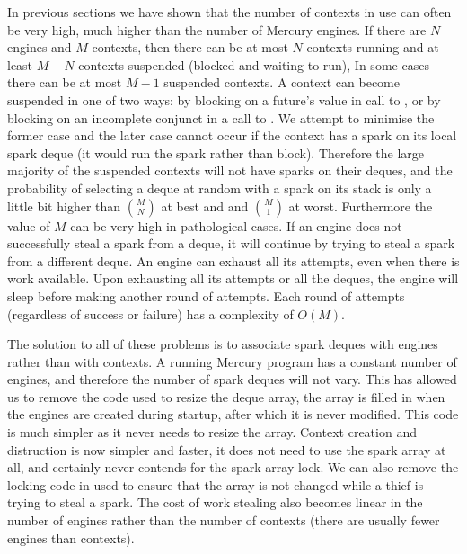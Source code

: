 \begin{description}
    In previous sections
    we have shown that the number of contexts in use can often be very high,
    much higher than the number of Mercury engines.
    If there are $N$ engines and $M$ contexts,
    then there can be at most $N$ contexts running and
    at least $M-N$ contexts suspended (blocked and waiting to run),
    In some cases there can be at most $M-1$ suspended contexts.
    A context can become suspended in one of two ways:
    by blocking on a future's value in call to \wait,
    or by blocking on an incomplete conjunct in a call to \joinandcontinue.
    We attempt to minimise the former case and the later case cannot occur
    if the context has a spark on its local spark deque (it would run the
    spark rather than block).
    Therefore the large majority of the suspended contexts will not have
    sparks on their deques,
    and the probability of selecting a deque at random with a spark on its
    stack is only a little bit higher than $M \choose N$ at best and
    and $M \choose 1$ at worst.
    Furthermore the value of $M$ can be very high in pathological cases.
    If an engine does not successfully steal a spark from a deque,
    it will continue by trying to steal a spark from a different deque.
    An engine can exhaust all its attempts, even when there is work
    available.
    Upon exhausting all its attempts or all the deques,
    the engine will sleep before making another round of attempts.
    Each round of attempts (regardless of success or failure) has a
    complexity of $O(M)$.

\end{description}

\noindent
{}
The solution to all of these problems is to associate spark deques with
engines rather than with contexts.
A running Mercury program has a constant number of engines,
and therefore the number of spark deques will not vary.
This has allowed us to remove the code used to resize the deque array,
the array is filled in when the engines are created during startup,
after which it is never modified.
This code is much simpler as it never needs to resize the array.
Context creation and distruction is now simpler and faster,
it does not need to use the spark array at all, and certainly never contends
for the spark array lock.
We can also remove the locking code in \trystealspark used to ensure that
the array is not changed while a thief is trying to steal a spark.
The cost of work stealing also becomes linear in the number of engines
rather than the number of contexts (there are usually fewer engines than
contexts).

